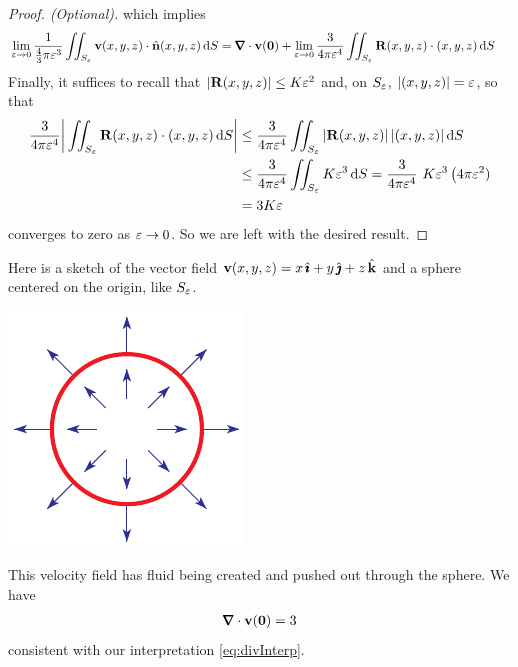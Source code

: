 \begin{proof}[Proof. (Optional)]
which implies
\begin{align*}
\lim_{\veps\rightarrow 0}
     \frac{1}{\frac{4}{3}\pi\veps^3}
           \dblInt_{S_\veps}\vv(x,y,z)\cdot\hn(x,y,z)\,\dee{S}
&= \vnabla\cdot\vv(\vZero)
   +\lim_{\veps\rightarrow 0}
     \frac{3}{4\pi\veps^4}
           \dblInt_{S_\veps}\vR(x,y,z)\cdot (x,y,z)\,\dee{S} 
\end{align*}
Finally, it suffices to recall that
$|\mathbf{R}(x,y,z)|\le K\varepsilon^2$ and, on $S_\varepsilon$,
$|(x,y,z)|=\varepsilon$, so that
\begin{align*}
\frac{3}{4\pi\varepsilon^4}\bigg|
           \iint_{S_\varepsilon}\mathbf{R}(x,y,z)\cdot (x,y,z)\,\mathrm{d}S \bigg|
&\le \frac{3}{4\pi\varepsilon^4}
           \iint_{S_\varepsilon}|\mathbf{R}(x,y,z)|\,|(x,y,z)|\,\mathrm{d}S  \\
&\le \frac{3}{4\pi\varepsilon^4}
           \iint_{S_\varepsilon}K\varepsilon^3\,\mathrm{d}S 
= \frac{3}{4\pi\varepsilon^4} \ K\varepsilon^3\,\big(4\pi \varepsilon^2) \\
&= 3K\varepsilon
\end{align*}
converges to zero as $\varepsilon\rightarrow 0$. So we are left with the 
desired result.
\end{proof}

\begin{eg}\label{eg:divInterpA}
Here is a sketch of the vector field $\mathbf{v}(x,y,z) = x\,\hat{\pmb{\imath}}+y\,\hat{\pmb{\jmath}}+z\,\hat{\mathbf{k}}$
and a sphere centered on the origin, like $S_\varepsilon$. 
\begin{nfig}
\begin{center}
    \includegraphics{sourceDiv.pdf}
\end{center}
\end{nfig}
This velocity field has fluid being created and pushed out through
the sphere. We have
\begin{align*}
\vnabla\cdot\vv(\vZero) = 3
\end{align*}
consistent with our interpretation \eqref{eq:divInterp}.
\end{eg}


